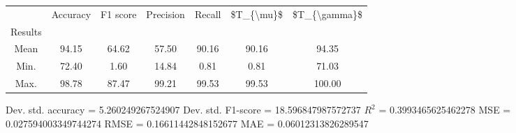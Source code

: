 \begin{tabular}{|c|c|c|c|c|c|c|}
\toprule
{} &  Accuracy &  F1 score &  Precision &  Recall &  \$T\_\{\textbackslash mu\}\$ &  \$T\_\{\textbackslash gamma\}\$ \\
Results &           &           &            &         &            &               \\
\hline
Mean    &     94.15 &     64.62 &      57.50 &   90.16 &      90.16 &         94.35 \\
Min.    &     72.40 &      1.60 &      14.84 &    0.81 &       0.81 &         71.03 \\
Max.    &     98.78 &     87.47 &      99.21 &   99.53 &      99.53 &        100.00 \\
\bottomrule
\end{tabular}

 Dev. std. accuracy = 5.260249267524907
 Dev. std. F1-score = 18.596847987572737
 $R^2$ = 0.3993465625462278
 MSE = 0.027594003349744274
 RMSE = 0.16611442848152677
 MAE = 0.06012313826289547